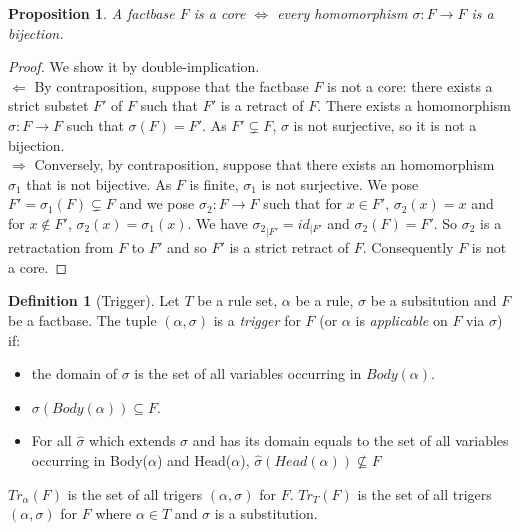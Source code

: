 \documentclass{article}
\newtheorem{proposition}{Proposition}[section]
\theoremstyle{definition}
\newtheorem{definition}{Definition}[section]
\theoremstyle{remark}
\begin{document}
\begin{proposition}
A factbase $F$ is a core $\Leftrightarrow$ every homomorphism $\sigma: F \to F$ is a bijection.
\end{proposition}

\begin{proof}
We show it by double-implication. \\
$\boxed{\Leftarrow}$ By contraposition, suppose that the factbase $F$ is not a core: there exists a strict substet $F'$ of $F$ such that $F'$ is a retract of $F$. There exists a homomorphism $\sigma:F \to F$ such that $\sigma(F) = F'$. As $F' \subsetneq F$, $\sigma$ is not surjective, so it is not a bijection. \\
$\boxed{\Rightarrow}$ Conversely, by contraposition, suppose that there exists an homomorphism $\sigma_1$ that is not bijective. As $F$ is finite, $\sigma_1$ is not surjective. We pose $F' = \sigma_1(F)\subsetneq F$ and we pose $\sigma_2:F \to F$ such that for $x \in F'$, $\sigma_2(x) = x$ and for $x \notin F'$, $\sigma_2(x) = \sigma_1(x)$. We have ${\sigma_2}_{|F'} = id_{|F'}$ and $\sigma_2(F) = F'$. So $\sigma_2$ is a retractation from $F$ to $F'$ and so $F'$ is a strict retract of $F$. Consequently $F$ is not a core.
\end{proof}



\begin{definition}[Trigger]
Let $T$ be a rule set, $\alpha$ be a rule, $\sigma$ be a subsitution and $F$ be a factbase. The tuple $(\alpha,\sigma)$ is a \emph{trigger} for $F$ (or $\alpha$ is \emph{applicable} on $F$ via $\sigma$) if: 
\begin{itemize}
\item the domain of $\sigma$ is the set of all variables occurring in $Body(\alpha)$.
\item $\sigma(Body(\alpha)) \subseteq F$.
\item For all $\hat \sigma$ which extends $\sigma$ and has its domain equals to the set of all variables occurring in Body($\alpha$) and Head($\alpha$), $\hat \sigma(Head(\alpha)) \nsubseteq F$
\end{itemize}
\emph{$Tr_{\alpha}(F)$} is the set of all trigers $(\alpha,\sigma)$ for $F$. \emph{$Tr_{T}(F)$} is the set of all trigers $(\alpha,\sigma)$ for $F$ where $\alpha \in T$ and $\sigma$ is a substitution. 
\end{definition}
\end{document}
